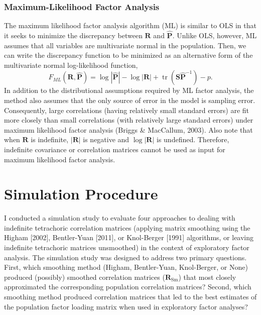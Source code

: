 \documentclass[
  english,
  man]{apa6}
\begin{document}
\hypertarget{maximum-likelihood-factor-analysis}{%
\subsubsection{Maximum-Likelihood Factor Analysis}\label{maximum-likelihood-factor-analysis}}

The maximum likelihood factor analysis algorithm (ML) is similar to OLS in that it seeks to minimize the discrepancy between \(\mathbf{R}\) and \(\hat{\mathbf{P}}\). Unlike OLS, however, ML assumes that all variables are multivariate normal in the population. Then, we can write the discrepancy function to be minimized as an alternative form of the multivariate normal log-likelihood function,
\begin{equation}
F_{ML}(\mathbf{R}, \hat{\mathbf{P}}) = \log|\hat{\mathbf{P}}| - \log|\mathbf{R}| + \mathop{\mathrm{tr}}(\mathbf{S}\hat{\mathbf{P}}^{-1}) - p.
\label{eq:ml-discrepancy}
\end{equation}
In addition to the distributional assumptions required by ML factor analysis, the method also assumes that the only source of error in the model is sampling error. Consequently, large correlations (having relatively small standard errors) are fit more closely than small correlations (with relatively large standard errors) under maximum likelihood factor analysis (Briggs \& MacCallum, 2003). Also note that when \(\mathbf{R}\) is indefinite, \(|\mathbf{R}|\) is negative and \(\log |\mathbf{R}|\) is undefined. Therefore, indefinite covariance or correlation matrices cannot be used as input for maximum likelihood factor analysis.

\hypertarget{simulation-procedure}{%
\section{Simulation Procedure}\label{simulation-procedure}}

I conducted a simulation study to evaluate four approaches to dealing with indefinite tetrachoric correlation matrices (applying matrix smoothing using the Higham {[}2002{]}, Bentler-Yuan {[}2011{]}, or Knol-Berger {[}1991{]} algorithms, or leaving indefinite tetrachoric matrices unsmoothed) in the context of exploratory factor analysis. The simulation study was designed to address two primary questions. First, which smoothing method (Higham, Bentler-Yuan, Knol-Berger, or None) produced (possibly) smoothed correlation matrices (\(\mathbf{R}_{\textrm{Sm}}\)) that most closely approximated the corresponding population correlation matrices? Second, which smoothing method produced correlation matrices that led to the best estimates of the population factor loading matrix when used in exploratory factor analyses?
\end{document}
